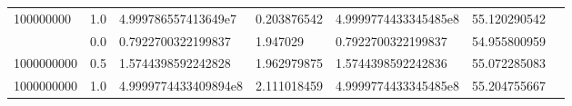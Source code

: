 \documentclass{article}
\begin{document}
\begin{landscape}
\begin{longtable}{@{}lllllll@{}}
    100000000 & 1.0 & 4.999786557413649e7 & 0.203876542 & 4.9999774433345485e8 & 55.120290542 \\
    \addlinespace
    1000000000 & 0.0 & 0.7922700322199837 & 1.947029 & 0.7922700322199837 & 54.955800959 \\
    1000000000 & 0.5 & 1.5744398592242828 & 1.962979875 & 1.5744398592242836 & 55.072285083 \\
    1000000000 & 1.0 & 4.9999774433409894e8 & 2.111018459 & 4.9999774433345485e8 & 55.204755667 \\
    \end{longtable}
\end{landscape}
\end{document}

